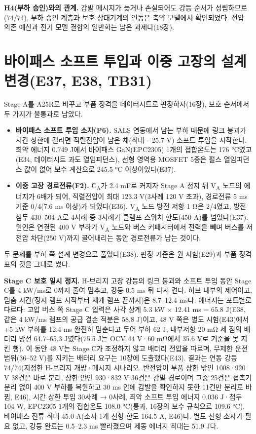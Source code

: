 \textbf{H4(부하 승인)와의 관계.} 감발 메시지가 늦거나 손실되어도 강등 순서가 성립하므로(74/74), 부하 승인 계층과 보호 상태기계의 연동은 축약 모델에서 확인되었다. 전압 의존 예산과 전기 모델 결합의 일반화는 남은 과제다(18장).

\section{바이패스 소프트 투입과 이중 고장의 설계 변경(E37, E38, TB31)}

Stage A를 A25R로 바꾸고 부품 정격을 데이터시트로 판정하자(16장), 보호 순서에서 두 가지가 불통과로 남았다.

\begin{itemize}
\item \textbf{바이패스 소프트 투입 소자(P6).} SALS 연동에서 남는 부하 때문에 링크 붕괴가 시간 상한에 걸리면 직렬전압이 남은 채(최대 −25.7 V) 소프트 투입을 시작한다. 최악 에너지 0.749 J에서 바이패스 GaN(EPC2305) 1개의 접합온도는 176 °C였고(E34, 데이터시트 과도 열임피던스), 선형 영역용 MOSFET 5종은 펄스 열임피던스 값이 없어 보수 계산으로 245.5 °C 이상이었다(E37).
\item \textbf{이중 고장 경로전류(F2).} C\textsubscript{A}가 2.4 mF로 커지자 Stage A 정지 뒤 V\textsubscript{A} 노드의 에너지가 6배가 되어, 직렬전압이 최대 123.3 V(3사례 120 V 초과), 경로전류 5 ms 기준 0/4(7.6 ms 이상)가 되었다(E36). V\textsubscript{A} 노드 방전 저항 1 Ω은 2/4였고, 방전 첨두 430–504 A로 4사례 중 3사례가 클램프 스위치 한도(450 A)를 넘었다(E37). 원인은 연결된 400 V 부하가 V\textsubscript{A} 노드와 버스 커패시터에서 전력을 빼며 버스를 저전압 차단(250 V)까지 끌어내리는 동안 경로전류가 남는 것이다.
\end{itemize}

두 문제를 부하 쪽 설계 변경으로 풀었다(E38). 판정 기준은 원 시험(E29)과 부품 정격 표의 것을 그대로 썼다.

\textbf{Stage C 보호 일시 정지.} H-브리지 고장 강등의 링크 붕괴와 소프트 투입 동안 Stage C를 4 kW/ms로 0까지 줄여 멈추고, 강등 0.5 ms 뒤 다시 켠다. 허브 내부의 제어이고, 멈춤 시간(정지 램프 시작부터 재개 램프 끝까지)은 8.7–12.4 ms다. 에너지는 포트별로 다르다: 고압 버스 쪽 Stage C 입력은 사각 상계 5.3 kW × 12.41 ms = 65.8 J(E38, 같은 4 kW/ms 램프의 공급 결손 적분은 58.8 J)이고, 48 V 쪽은 별도 시험(E43)에서 +5 kW 부하를 12.4 ms 완전히 멈춘다고 두어 부하 62 J, 내부저항 20 mΩ 세 점의 배터리 방전 64.7–65.3 J였다(75.5 J는 OCV 44 V·60 mΩ에서 35.6 V로 기준을 못 지킨 행). 이 동안 48 V는 Stage C가 조정하지 않고 배터리 전압을 따르며, 무제한 운전 범위(36–52 V)를 지키는 배터리 요구는 10장에 도출했다(E43). 결과는 연동 강등 74/74(지정한 H-브리지 개방·메시지 시나리오. 반전압이 부품 상한 밖인 1008·920 V 38건은 바로 분리, 상한 안인 930·832 V 36건은 감발 경로이며 그중 25건은 접촉기 분리 없이 400 V 부하를 복원하고 30 ms 안에 감발을 확인하지 못한 11건만 분리로 바뀜, E46), 시간 상한 투입 30사례 → 0사례, 최악 소프트 투입 에너지 0.036 J·첨두 104 W, EPC2305 1개의 접합온도 108.0 °C(통과, 16장의 보수 규칙으로 109.6 °C), 바이패스 전류 최대 45.0 A(소자 1개 선형 한도 164.5 A, E46)다. 별도 선형 소자가 필요 없고, 강등 완료는 0.5–2.3 ms 빨라졌으며 제동 에너지 최대는 51.9 J다.

